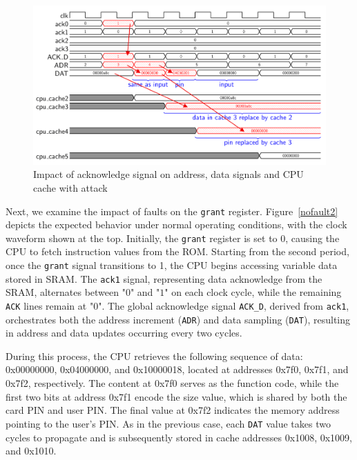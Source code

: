 \begin{figure}[t!]
  \centering
  \includegraphics[width=\linewidth]{Chapitre4/figures/fault1.png}
  \caption{Impact of acknowledge signal on address, data signals and CPU cache with attack}
  \label{fault1}
\end{figure}

Next, we examine the impact of faults on the \texttt{grant} register. Figure~\ref{nofault2} depicts the expected behavior under normal operating conditions, with the clock waveform shown at the top. Initially, the \texttt{grant} register is set to 0, causing the CPU to fetch instruction values from the ROM. Starting from the second period, once the \texttt{grant} signal transitions to 1, the CPU begins accessing variable data stored in SRAM. The \texttt{ack1} signal, representing data acknowledge from the SRAM, alternates between "$0$" and "$1$" on each clock cycle, while the remaining \texttt{ACK} lines remain at "$0$". The global acknowledge signal \texttt{ACK\_D}, derived from \texttt{ack1}, orchestrates both the address increment (\texttt{ADR}) and data sampling (\texttt{DAT}), resulting in address and data updates occurring every two cycles.

During this process, the CPU retrieves the following sequence of data: 0x00000000, 0x04000000, and 0x10000018, located at addresses 0x7f0, 0x7f1, and 0x7f2, respectively. The content at 0x7f0 serves as the function code, while the first two bits at address 0x7f1 encode the size value, which is shared by both the card PIN and user PIN. The final value at 0x7f2 indicates the memory address pointing to the user's PIN. As in the previous case, each \texttt{DAT} value takes two cycles to propagate and is subsequently stored in cache addresses 0x1008, 0x1009, and 0x1010.

